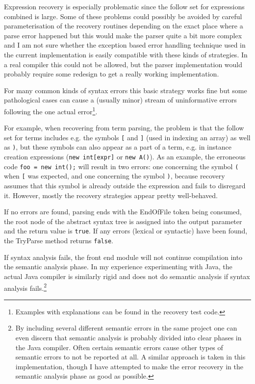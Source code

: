 \documentclass[a4paper,11pt]{article}
\begin{document}
Expression recovery is especially problematic since the follow set for expressions combined is large. Some of these problems could possibly be avoided by careful parameterisation of the recovery routines depending on the exact place where a parse error happened but this would make the parser quite a bit more complex and I am not sure whether the exception based error handling technique used in the current implementation is easily compatible with these kinds of strategies. In a real compiler this could not be allowed, but the parser implementation would probably require some redesign to get a really working implementation.

For many common kinds of syntax errors this basic strategy works fine but some pathological cases can cause a (usually minor) stream of uninformative errors following the one actual error\footnote{Examples with explanations can be found in the recovery test code.}.

For example, when recovering from term parsing, the problem is that the follow set for terms includes e.g. the symbols \verb,[, and \verb,], (used in indexing an array) as well as \verb,),, but these symbols can also appear as a part of a term, e.g. in instance creation expressions (\verb,new int[expr], or \verb,new A(),). As an example, the erroneous code \verb,foo = new int();, will result in two errors: one concerning the symbol \verb,(, when \verb,[, was expected, and one concerning the symbol \verb,),, because recovery assumes that this symbol is already outside the expression and fails to disregard it. However, mostly the recovery strategies appear pretty well-behaved.

If no errors are found, parsing ends with the EndOfFile token being consumed, the root node of the abstract syntax tree is assigned into the output parameter and the return value is \verb,true,. If any errors (lexical or syntactic) have been found, the TryParse method returns \verb,false,.

If syntax analysis fails, the front end module will not continue compilation into the semantic analysis phase. In my experience experimenting with Java, the actual Java compiler is similarly rigid and does not do semantic analysis if syntax analysis fails.\footnote{By including several different semantic errors in the same project one can even discern that semantic analysis is probably divided into clear phases in the Java compiler. Often certain semantic errors cause other types of semantic errors to not be reported at all. A similar approach is taken in this implementation, though I have attempted to make the error recovery in the semantic analysis phase as good as possible.}
\end{document}
